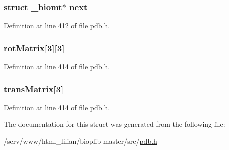 \hypertarget{struct__biomt_a7e81b9381876e459056d51ea11f4c45b}{
\subsubsection[{next}]{\setlength{\rightskip}{0pt plus 5cm}struct {\bf \-\_\-biomt}$\ast$ next}}\label{struct__biomt_a7e81b9381876e459056d51ea11f4c45b}


Definition at line 412 of file pdb.\-h.

\hypertarget{struct__biomt_a7e607adbc99d6e07fbee835a8c1aa9e5}{
\subsubsection[{rot\-Matrix}]{ rot\-Matrix\mbox{[}3\mbox{]}\mbox{[}3\mbox{]}}}\label{struct__biomt_a7e607adbc99d6e07fbee835a8c1aa9e5}


Definition at line 414 of file pdb.\-h.

\hypertarget{struct__biomt_a2b495a90c016d85049bbe560e41545b6}{
\subsubsection[{trans\-Matrix}]{ trans\-Matrix\mbox{[}3\mbox{]}}}\label{struct__biomt_a2b495a90c016d85049bbe560e41545b6}


Definition at line 414 of file pdb.\-h.



The documentation for this struct was generated from the following file\-:\begin{DoxyCompactItemize}
\item 
/serv/www/html\-\_\-lilian/bioplib-\/master/src/\hyperlink{pdb_8h}{pdb.\-h}\end{DoxyCompactItemize}
